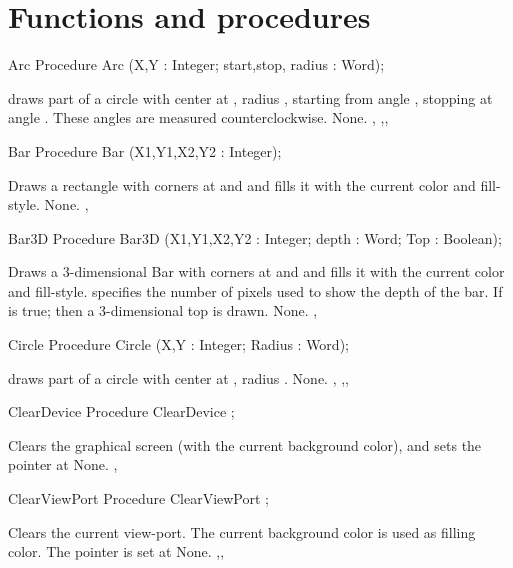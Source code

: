 \section{Functions and procedures}
\begin{procedure}{Arc}
\Declaration
Procedure Arc (X,Y : Integer; start,stop, radius : Word);

\Description
  draws part of a circle with center at , radius
, starting from angle , stopping at angle .
These  angles are measured
counterclockwise.
\Errors
None.
\SeeAlso
{}, 
,, 
\end{procedure}
\begin{procedure}{Bar}
\Declaration
Procedure Bar (X1,Y1,X2,Y2 : Integer);

\Description
Draws a rectangle with corners at  and  
and fills it with the current color and fill-style.
\Errors
None.
\SeeAlso
{}, 
\end{procedure}
\begin{procedure}{Bar3D}
\Declaration
Procedure Bar3D (X1,Y1,X2,Y2 : Integer; depth : Word; Top : Boolean);

\Description
Draws a 3-dimensional Bar  with corners at  and  
and fills it with the current color and fill-style.
 specifies the number of pixels used to show the depth of the
bar.
If  is true; then a 3-dimensional top is drawn.
\Errors
None.
\SeeAlso
{}, 
\end{procedure}
\begin{procedure}{Circle}
\Declaration
Procedure Circle (X,Y : Integer; Radius : Word);

\Description
  draws part of a circle with center at , radius
.
\Errors
None.
\SeeAlso
{},
,, 
\end{procedure}
\begin{procedure}{ClearDevice}
\Declaration
Procedure ClearDevice ;

\Description
Clears the graphical screen (with the current
background color), and sets the pointer at 
\Errors
None.
\SeeAlso
{}, 
\end{procedure}
\begin{procedure}{ClearViewPort}
\Declaration
Procedure ClearViewPort ;

\Description
Clears the current view-port. The current background color is used as filling
color. The pointer is set at
\Errors
None.
\SeeAlso
{},, 
\end{procedure}
